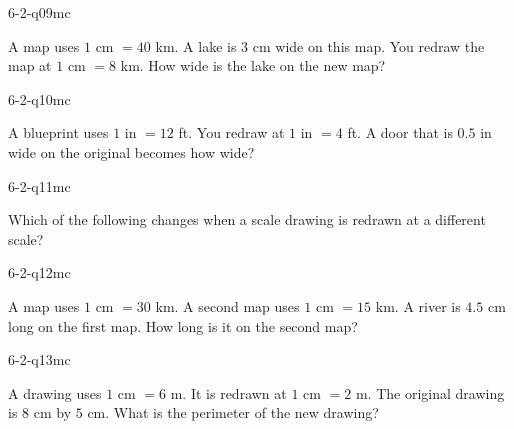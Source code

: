 \begin{practiceQuestion}{6-2-q09}{mc}
\begin{questionText}
A map uses $1$ cm $= 40$ km. A lake is $3$ cm wide on this map. You redraw the map at $1$ cm $= 8$ km. How wide is the lake on the new map?
\end{questionText}
\end{practiceQuestion}

\begin{practiceQuestion}{6-2-q10}{mc}
\begin{questionText}
A blueprint uses $1$ in $= 12$ ft. You redraw at $1$ in $= 4$ ft. A door that is $0.5$ in wide on the original becomes how wide?
\end{questionText}
\end{practiceQuestion}

\begin{practiceQuestion}{6-2-q11}{mc}
\begin{questionText}
Which of the following changes when a scale drawing is redrawn at a different scale?
\end{questionText}
\end{practiceQuestion}

\begin{practiceQuestion}{6-2-q12}{mc}
\begin{questionText}
A map uses $1$ cm $= 30$ km. A second map uses $1$ cm $= 15$ km. A river is $4.5$ cm long on the first map. How long is it on the second map?
\end{questionText}
\end{practiceQuestion}

\begin{practiceQuestion}{6-2-q13}{mc}
\begin{questionText}
A drawing uses $1$ cm $= 6$ m. It is redrawn at $1$ cm $= 2$ m. The original drawing is $8$ cm by $5$ cm. What is the perimeter of the new drawing?
\end{questionText}
\end{practiceQuestion}

